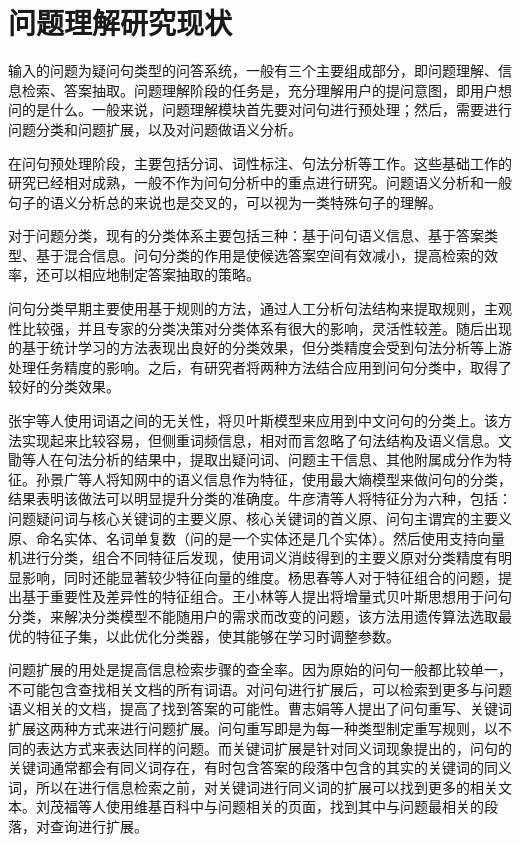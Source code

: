 \documentclass[master, winfont]{njuthesis}
\begin{document}
\section{问题理解研究现状}
输入的问题为疑问句类型的问答系统，一般有三个主要组成部分，即问题理解、信息检索、答案抽取。问题理解阶段的任务是，充分理解用户的提问意图，即用户想问的是什么。一般来说，问题理解模块首先要对问句进行预处理；然后，需要进行问题分类和问题扩展\cite{Cao2005QA}，以及对问题做语义分析。

在问句预处理阶段，主要包括分词、词性标注、句法分析等工作。这些基础工作的研究已经相对成熟，一般不作为问句分析中的重点进行研究。问题语义分析和一般句子的语义分析总的来说也是交叉的，可以视为一类特殊句子的理解。

对于问题分类，现有的分类体系主要包括三种：基于问句语义信息、基于答案类型、基于混合信息\cite{ZhangNing2016}。问句分类的作用是使候选答案空间有效减小，提高检索的效率，还可以相应地制定答案抽取的策略。

问句分类早期主要使用基于规则的方法，通过人工分析句法结构来提取规则，主观性比较强，并且专家的分类决策对分类体系有很大的影响，灵活性较差。随后出现的基于统计学习的方法表现出良好的分类效果，但分类精度会受到句法分析等上游处理任务精度的影响。之后，有研究者将两种方法结合应用到问句分类中，取得了较好的分类效果。

张宇等人\cite{ZY2004}使用词语之间的无关性，将贝叶斯模型来应用到中文问句的分类上。该方法实现起来比较容易，但侧重词频信息，相对而言忽略了句法结构及语义信息。文勖等人\cite{Wen2006}在句法分析的结果中，提取出疑问词、问题主干信息、其他附属成分作为特征。孙景广等人\cite{Sun2007}将知网中的语义信息作为特征，使用最大熵模型来做问句的分类，结果表明该做法可以明显提升分类的准确度。牛彦清等人\cite{Niu2012}将特征分为六种，包括：问题疑问词与核心关键词的主要义原、核心关键词的首义原、问句主谓宾的主要义原、命名实体、名词单复数（问的是一个实体还是几个实体）。然后使用支持向量机进行分类，组合不同特征后发现，使用词义消歧得到的主要义原对分类精度有明显影响，同时还能显著较少特征向量的维度。杨思春等人\cite{YangSC2014}对于特征组合的问题，提出基于重要性及差异性的特征组合。王小林等人\cite{WangXL2014}提出将增量式贝叶斯思想用于问句分类，来解决分类模型不能随用户的需求而改变的问题，该方法用遗传算法选取最优的特征子集，以此优化分类器，使其能够在学习时调整参数。

问题扩展的用处是提高信息检索步骤的查全率。因为原始的问句一般都比较单一，不可能包含查找相关文档的所有词语。对问句进行扩展后，可以检索到更多与问题语义相关的文档，提高了找到答案的可能性。曹志娟等人\cite{Cao2005QA}提出了问句重写、关键词扩展这两种方式来进行问题扩展。问句重写即是为每一种类型制定重写规则，以不同的表达方式来表达同样的问题。而关键词扩展是针对同义词现象提出的，问句的关键词通常都会有同义词存在，有时包含答案的段落中包含的其实的关键词的同义词，所以在进行信息检索之前，对关键词进行同义词的扩展可以找到更多的相关文本。刘茂福等人\cite{Liu2012QA}使用维基百科中与问题相关的页面，找到其中与问题最相关的段落，对查询进行扩展。
\end{document}
